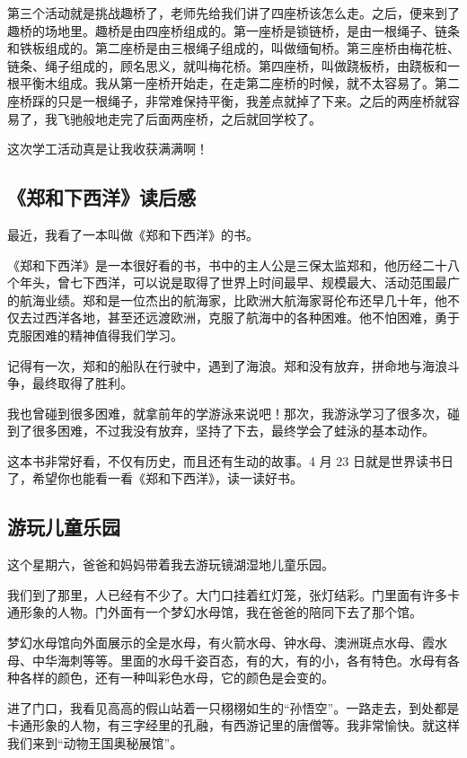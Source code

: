 \documentclass[UTF8,a4paper,titlepage,twoside,10.5pt]{article}
\begin{document}
第三个活动就是挑战趣桥了，老师先给我们讲了四座桥该怎么走。之后，便来到了趣桥的场地里。趣桥是由四座桥组成的。第一座桥是锁链桥，是由一根绳子、链条和铁板组成的。第二座桥是由三根绳子组成的，叫做缅甸桥。第三座桥由梅花桩、链条、绳子组成的，顾名思义，就叫梅花桥。第四座桥，叫做跷板桥，由跷板和一根平衡木组成。我从第一座桥开始走，在走第二座桥的时候，就不太容易了。第二座桥踩的只是一根绳子，非常难保持平衡，我差点就掉了下来。之后的两座桥就容易了，我飞驰般地走完了后面两座桥，之后就回学校了。

这次学工活动真是让我收获满满啊！

\subsection{《郑和下西洋》读后感}
\label{sec:org49a6778}

最近，我看了一本叫做《郑和下西洋》的书。

《郑和下西洋》是一本很好看的书，书中的主人公是三保太监郑和，他历经二十八个年头，曾七下西洋，可以说是取得了世界上时间最早、规模最大、活动范围最广的航海业绩。郑和是一位杰出的航海家，比欧洲大航海家哥伦布还早几十年，他不仅去过西洋各地，甚至还远渡欧洲，克服了航海中的各种困难。他不怕困难，勇于克服困难的精神值得我们学习。

记得有一次，郑和的船队在行驶中，遇到了海浪。郑和没有放弃，拼命地与海浪斗争，最终取得了胜利。

我也曾碰到很多困难，就拿前年的学游泳来说吧！那次，我游泳学习了很多次，碰到了很多困难，不过我没有放弃，坚持了下去，最终学会了蛙泳的基本动作。

这本书非常好看，不仅有历史，而且还有生动的故事。4 月 23 日就是世界读书日了，希望你也能看一看《郑和下西洋》，读一读好书。

\subsection{游玩儿童乐园}
\label{sec:org226a61e}

这个星期六，爸爸和妈妈带着我去游玩镜湖湿地儿童乐园。

我们到了那里，人已经有不少了。大门口挂着红灯笼，张灯结彩。门里面有许多卡通形象的人物。门外面有一个梦幻水母馆，我在爸爸的陪同下去了那个馆。

梦幻水母馆向外面展示的全是水母，有火箭水母、钟水母、澳洲斑点水母、霞水母、中华海刺等等。里面的水母千姿百态，有的大，有的小，各有特色。水母有各种各样的颜色，还有一种叫彩色水母，它的颜色是会变的。

进了门口，我看见高高的假山站着一只栩栩如生的“孙悟空”。一路走去，到处都是卡通形象的人物，有三字经里的孔融，有西游记里的唐僧等。我非常愉快。就这样我们来到“动物王国奥秘展馆”。
\end{document}
